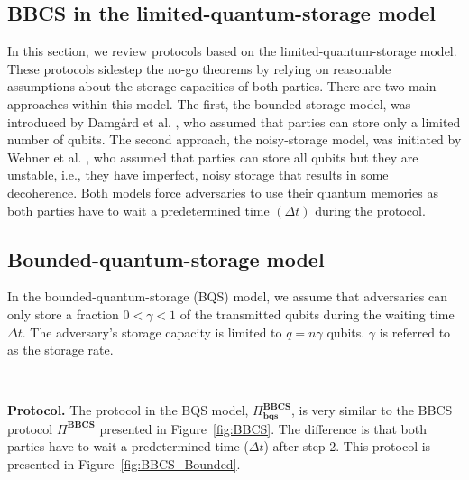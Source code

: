 \subsection{BBCS in the limited-quantum-storage model}

In this section, we review protocols based on the limited-quantum-storage model. These protocols sidestep the no-go theorems by relying on reasonable assumptions about the storage capacities of both parties. There are two main approaches within this model. The first, the bounded-storage model, was introduced by Damg{\aa}rd et al. \cite{DFSS05}, who assumed that parties can store only a limited number of qubits. The second approach, the noisy-storage model, was initiated by Wehner et al. \cite{WST08}, who assumed that parties can store all qubits but they are unstable, i.e., they have imperfect, noisy storage that results in some decoherence. Both models force adversaries to use their quantum memories as both parties have to wait a predetermined time $(\Delta t)$ during the protocol.

\subsection{Bounded-quantum-storage model}

In the bounded-quantum-storage (BQS) model, we assume that adversaries can only store a fraction $0<\gamma<1$ of the transmitted qubits during the waiting time $\Delta t$. The adversary's storage capacity is limited to $q=n\gamma$ qubits. $\gamma$ is referred to as the storage rate.

\

\noindent\textbf{Protocol.} The protocol in the BQS model, $\Pi^{\textbf{BBCS}}_{\textbf{bqs}}$, is very similar to the BBCS protocol $\Pi^{\textbf{BBCS}}$ presented in Figure~\ref{fig:BBCS}. The difference is that both parties have to wait a predetermined time ($\Delta t$) after step 2. This protocol is presented in Figure~\ref{fig:BBCS_Bounded}.

